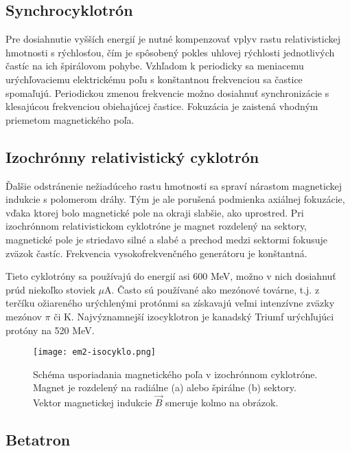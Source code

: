 \documentclass[../../main.tex]{subfiles}
\begin{document}
\subsection{Synchrocyklotrón}

Pre dosiahnutie vyšších energií je nutné kompenzovať vplyv rastu relativistickej hmotnosti s rýchlosťou, čím je spôsobený pokles uhlovej rýchlosti jednotlivých častíc na ich špirálovom pohybe. Vzhľadom k periodicky sa meniacemu urýchľovaciemu elektrickému poľu s konštantnou frekvenciou sa častice spomaľujú. Periodickou zmenou frekvencie možno dosiahnuť synchronizácie s klesajúcou frekvenciou obiehajúcej častice. Fokuzácia je zaistená vhodným priemetom magnetického poľa.

\subsection{Izochrónny relativistický cyklotrón}

Ďalšie odstránenie nežiadúceho rastu hmotnosti sa spraví nárastom magnetickej indukcie s polomerom dráhy. Tým je ale porušená podmienka axiálnej fokuzácie, vďaka ktorej bolo magnetické pole na okraji slabšie, ako uprostred. Pri izochrónnom relativistickom cyklotróne je magnet rozdelený na sektory, magnetické pole je striedavo silné a slabé a prechod medzi sektormi fokusuje zväzok častíc. Frekvencia vysokofrekvenčného generátoru je konštantná.

Tieto cyklotróny sa používajú do energií asi 600 MeV, možno v nich dosiahnuť prúd niekoľko stoviek $\mu$A. Často sú používané ako mezónové továrne, t.j. z terčíku ožiareného urýchlenými protónmi sa získavajú veľmi intenzívne zväzky mezónov $\pi$ či K. Najvýznamnejší izocyklotron je kanadský Triumf urýchľujúci protóny na 520 MeV.

\begin{figure}[h]
\centering
\texttt{[image: em2-isocyklo.png]}
\caption{Schéma usporiadania magnetického poľa v izochrónnom cyklotróne. Magnet je rozdelený na radiálne (a) alebo špirálne (b) sektory. Vektor magnetickej indukcie $\vec{B}$ smeruje kolmo na obrázok.}
\label{em2:img:isocyklo}
\end{figure}

\subsection{Betatron}
\end{document}
